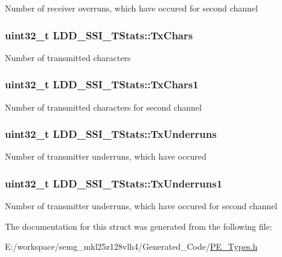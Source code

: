 Number of receiver overruns, which have occured for second channel \hypertarget{struct_l_d_d___s_s_i___t_stats_abaff1182d41c2c211ce8da947df77bbd}{
\subsubsection[{Tx\-Chars}]{\setlength{\rightskip}{0pt plus 5cm}uint32\-\_\-t L\-D\-D\-\_\-\-S\-S\-I\-\_\-\-T\-Stats\-::\-Tx\-Chars}}\label{struct_l_d_d___s_s_i___t_stats_abaff1182d41c2c211ce8da947df77bbd}
Number of transmitted characters \hypertarget{struct_l_d_d___s_s_i___t_stats_a0721d681a52cc566e4c89de10e962923}{
\subsubsection[{Tx\-Chars1}]{\setlength{\rightskip}{0pt plus 5cm}uint32\-\_\-t L\-D\-D\-\_\-\-S\-S\-I\-\_\-\-T\-Stats\-::\-Tx\-Chars1}}\label{struct_l_d_d___s_s_i___t_stats_a0721d681a52cc566e4c89de10e962923}
Number of transmitted characters for second channel \hypertarget{struct_l_d_d___s_s_i___t_stats_a5ac8911e76989013a9a4757a90aa5660}{
\subsubsection[{Tx\-Underruns}]{\setlength{\rightskip}{0pt plus 5cm}uint32\-\_\-t L\-D\-D\-\_\-\-S\-S\-I\-\_\-\-T\-Stats\-::\-Tx\-Underruns}}\label{struct_l_d_d___s_s_i___t_stats_a5ac8911e76989013a9a4757a90aa5660}
Number of transmitter underruns, which have occured \hypertarget{struct_l_d_d___s_s_i___t_stats_a14fb329147ead1d214cd25ffd3b39f6d}{
\subsubsection[{Tx\-Underruns1}]{\setlength{\rightskip}{0pt plus 5cm}uint32\-\_\-t L\-D\-D\-\_\-\-S\-S\-I\-\_\-\-T\-Stats\-::\-Tx\-Underruns1}}\label{struct_l_d_d___s_s_i___t_stats_a14fb329147ead1d214cd25ffd3b39f6d}
Number of transmitter underruns, which have occured for second channel 

The documentation for this struct was generated from the following file\-:\begin{DoxyCompactItemize}
\item 
E\-:/workspace/semg\-\_\-mkl25z128vlh4/\-Generated\-\_\-\-Code/\hyperlink{_p_e___types_8h}{P\-E\-\_\-\-Types.\-h}\end{DoxyCompactItemize}
